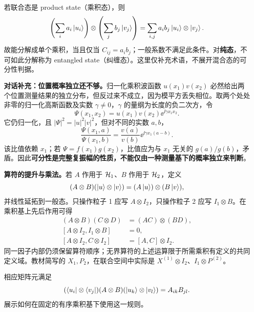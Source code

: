 若联合态是 product state（乘积态），则
\begin{equation}
  \left(\sum_i a_i\left|u_i\right\rangle\right)\otimes
  \left(\sum_j b_j\left|v_j\right\rangle\right)
    =\sum_{i,j}a_i b_j\left|u_i\right\rangle\otimes\left|v_j\right\rangle.
\end{equation}
故能分解成单个乘积，当且仅当 $C_{ij}=a_i b_j$；一般系数不满足此条件。对\textbf{纯态}，不可如此分解称为 entangled state（纠缠态）。这里仅补充术语，不展开混合态的可分性判据。

\textbf{对话补充：位置概率独立还不够。}归一化乘积波函数 $u(x_1)v(x_2)$ 必然给出两个位置测量结果的独立分布，但反过来不成立，因为模平方丢失相位。取两个处处非零的归一化高斯函数及实数 $\gamma\ne0$，$\gamma$ 的量纲为长度的负二次方，令
\begin{equation}
  \Psi(x_1,x_2)=u(x_1)v(x_2)\ee^{\ii\gamma x_1x_2}.
\end{equation}
它仍归一化，且 $|\Psi|^2=|u|^2|v|^2$，但对不同的实数 $a,b$，
\begin{equation}
  \frac{\Psi(x_1,a)}{\Psi(x_1,b)}
   =\frac{v(a)}{v(b)}\ee^{\ii\gamma x_1(a-b)}.
\end{equation}
该比值依赖 $x_1$；若 $\Psi=f(x_1)g(x_2)$，比值应为与 $x_1$ 无关的 $g(a)/g(b)$，矛盾。因此\textbf{可分性是完整复振幅的性质，不能仅由一种测量基下的概率独立来判断}。

\textbf{算符的提升与乘法。}若 $A$ 作用于 $\mathcal{H}_1$、$B$ 作用于 $\mathcal{H}_2$，定义
\begin{equation}
  (A\otimes B)(\left|u\right\rangle\otimes\left|v\right\rangle)=(A\left|u\right\rangle)\otimes(B\left|v\right\rangle),
\end{equation}
并线性延拓到一般态。只操作粒子 1 应写 $A\otimes I_2$，只操作粒子 2 应写 $I_1\otimes B$。在乘积基上先后作用可得
\begin{align}
  (A\otimes B)(C\otimes D)&=(AC)\otimes(BD),\\
  [A\otimes I_2,I_1\otimes B]&=0,\\
  [A\otimes I_2,C\otimes I_2]&=[A,C]\otimes I_2.
\end{align}
同一因子内部仍须保留算符顺序；无界算符的上述运算限于所需乘积有定义的共同定义域。教材简写的 $X_1,P_2$，在联合空间中实际是 $X^{(1)}\otimes I_2$、$I_1\otimes P^{(2)}$。

相应矩阵元满足
\begin{equation}
  (\left\langle u_i\right|\otimes\left\langle v_j\right|)(A\otimes B)
  (\left|u_k\right\rangle\otimes\left|v_l\right\rangle)=A_{ik}B_{jl}.
\end{equation}
 展示如何在固定的有序乘积基下使用这一规则。


